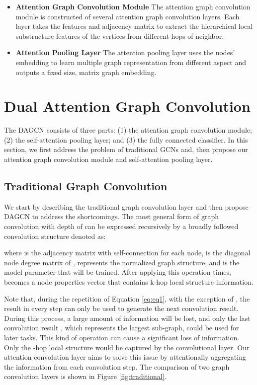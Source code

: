 \documentclass[conference]{IEEEtran}
\begin{document}
	   \begin{itemize}
            \item \textbf{Attention Graph Convolution Module} The attention graph convolution module is constructed of several attention graph convolution layers. Each layer takes the features  and adjacency matrix  to extract the hierarchical local substructure features of the vertices from different hops of neighbor. 
	        \item \textbf{Attention Pooling Layer} The attention pooling layer uses the nodes' embedding to learn multiple graph representation from different aspect and outputs a fixed size, matrix graph embedding.
	   \end{itemize}
	
	\section{Dual Attention Graph Convolution}
		The DAGCN consists of three parts: (1) the attention graph convolution module; (2) the self-attention pooling layer; and (3) the fully connected classifier. In this section, we first address the problem of traditional GCNs and, then propose our attention graph convolution module and self-attention pooling layer.
		
		\subsection{Traditional Graph Convolution} We start by describing the traditional graph convolution layer and then propose DAGCN to address the shortcomings. The most general form of graph convolution with depth of  can be expressed recursively by a broadly followed convolution structure denoted as:

		
		
		where  is the adjacency matrix with self-connection for each node,  is the diagonal node degree matrix of ,  represents the normalized graph structure, and  is the model parameter that will be trained. After applying this operation  times,  becomes a node properties vector that contains k-hop local structure information.
		
		Note that, during the repetition of Equation \ref{eq:eq1}, with the exception of , the result in every step can only be used to generate the next convolution result. During this process, a large amount of information will be lost, and only the last convolution result , which represents the largest sub-graph, could be used for later tasks. This kind of operation can cause a significant loss of information. Only the -hop local structure would be captured by the convolutional layer. Our attention convolution layer aims to solve this issue by attentionally aggregating the information from each convolution step. The comparison of two graph convolution layers is shown in Figure \ref{fig:traditional}.
		
\end{document}
